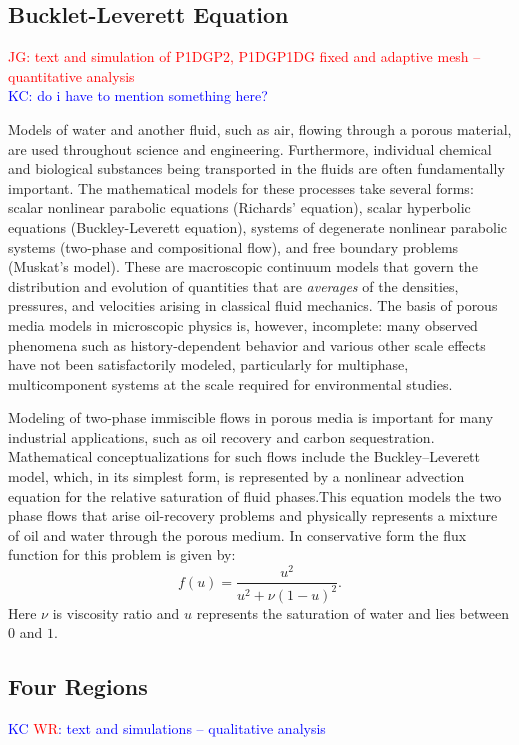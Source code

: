 \documentclass[preprint,authoryear,12pt]{elsarticle}
\begin{document}
\subsection{Bucklet-Leverett Equation}\label{section:BuckletLeverettEquation}
\textcolor{red}{JG: text and simulation of P1DGP2, P1DGP1DG fixed and adaptive mesh -- quantitative analysis}\\
\textcolor{blue}{KC: do i have to mention something here?\\}

Models of water and another fluid, such as air, flowing through a
porous material, are used throughout science and
engineering.  Furthermore, individual chemical and biological
substances being transported in the fluids are often fundamentally
important. The mathematical models for these processes take several forms: scalar nonlinear parabolic equations (Richards' equation), scalar hyperbolic equations (Buckley-Leverett equation), systems of degenerate nonlinear parabolic systems (two-phase and compositional flow), and free boundary problems (Muskat's model). These are macroscopic continuum models that govern the distribution and evolution of quantities that are {\em averages} of the densities, pressures, and velocities arising in classical fluid mechanics. The basis of porous media models in microscopic physics is, however, incomplete: many observed phenomena such as history-dependent behavior and various other scale effects have not been satisfactorily modeled, particularly for multiphase,
multicomponent systems at the scale required for environmental
studies.

Modeling of two-phase immiscible flows in porous media is
important for many industrial applications, such as oil recovery and carbon sequestration. Mathematical conceptualizations for such flows include the Buckley–Leverett model, which, in its simplest form, is represented by a nonlinear advection equation for the relative saturation of fluid phases.This equation models the two phase flows that arise oil-recovery problems and physically
represents a mixture of oil and water through the porous medium.
In conservative form the flux function for this
problem is given by:
\begin{equation}
f(u) = \frac{u^2}{u^2 + \nu(1-u)^2}. \label{buckley}
\end{equation}
Here $\nu$ is viscosity ratio and $u$ represents the saturation of water and
lies between $0$ and $1$.

\subsection{Four Regions}\label{section:4Regions}
\textcolor{blue}{KC \textcolor{red}{WR}: text and simulations -- qualitative analysis}\\
\end{document}
